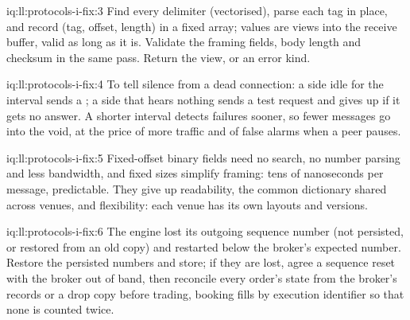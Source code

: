 \begin{solution}{iq:ll:protocols-i-fix:3}
Find every delimiter (vectorised), parse each tag in place, and record (tag, offset, length) in a fixed array; values are
views into the receive buffer, valid as long as it is. Validate the framing fields, body length and checksum in the same pass.
Return the view, or an error kind.
\end{solution}

\begin{solution}{iq:ll:protocols-i-fix:4}
To tell silence from a dead connection: a side idle for the interval sends a ; a side that hears nothing sends a test
request and gives up if it gets no answer. A shorter interval detects failures sooner, so fewer messages go into the void, at
the price of more traffic and of false alarms when a peer pauses.
\end{solution}

\begin{solution}{iq:ll:protocols-i-fix:5}
Fixed-offset binary fields need no search, no number parsing and less bandwidth, and fixed sizes simplify framing: tens of
nanoseconds per message, predictable. They give up readability, the common dictionary shared across venues, and flexibility:
each venue has its own layouts and versions.
\end{solution}

\begin{solution}{iq:ll:protocols-i-fix:6}
The engine lost its outgoing sequence number (not persisted, or restored from an old copy) and restarted below the broker's
expected number. Restore the persisted numbers and store; if they are lost, agree a sequence reset with the broker out of band,
then reconcile every order's state from the broker's records or a drop copy before trading, booking fills by execution
identifier so that none is counted twice.
\end{solution}
